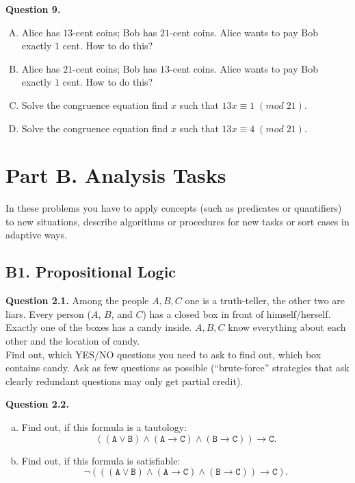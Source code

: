 \documentclass[jou]{apa6}
\begin{document}
\vspace{6pt}
{\bf Question 9.} 
\begin{enumerate}[(A)]
\item Alice has $13$-cent coins; Bob has $21$-cent coins. 
Alice wants to pay Bob exactly $1$ cent. How to do this?
\item Alice has $21$-cent coins; Bob has $13$-cent coins. 
Alice wants to pay Bob exactly $1$ cent. How to do this?
\item Solve the congruence equation \textendash{} find
$x$ such that $13x \equiv 1\;(mod\;21)$. 
\item Solve the congruence equation \textendash{} find
$x$ such that $13x \equiv 4\;(mod\;21)$. 
\end{enumerate}







\section{Part B. Analysis Tasks}

In these problems you have to apply concepts 
(such as predicates or quantifiers) to new situations, 
describe algorithms or procedures for new tasks
or sort cases in adaptive ways.


\subsection{B1. Propositional Logic}

{\bf Question 2.1.}
Among the people $A,B,C$ one is a truth-teller, 
the other two are liars. 
Every person ($A$, $B$, and $C$) has a closed box
in front of himself/herself. Exactly one of the 
boxes has a candy inside. $A,B,C$ know everything 
about each other and the location of candy.\\
Find out, which YES/NO questions you 
need to ask to find out, which box contains candy. 
Ask as few questions as possible 
(``brute-force'' strategies that ask clearly redundant
questions may only get partial credit). 

{\bf Question 2.2.} 
\begin{enumerate}[(a)]
\item Find out, if this formula is a tautology: 
$$\mathtt{((A \vee B) \wedge (A \rightarrow C) \wedge 
(B \rightarrow C)) \rightarrow C}.$$
\item Find out, if this formula is satisfiable: 
$$\mathtt{\neg (((A \vee B) \wedge (A \rightarrow C) \wedge 
(B \rightarrow C)) \rightarrow C)}.$$
\end{enumerate}
\end{document}
